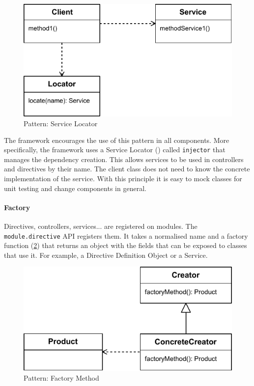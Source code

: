 \begin{figure}[htb]
    \centering
    \includegraphics{figures/design-patterns-servicelocator.pdf}
    \caption{Pattern: Service Locator}
    \label{fig:design-service-locator}
\end{figure}

The framework encourages the use of this pattern in all components. 
More specifically, the framework uses a Service Locator () called \texttt{injector} that manages the dependency creation.
This allows services to be used in controllers and directives by their name.
The client class does not need to know the concrete implementation of the service. 
With this principle it is easy to mock classes for unit testing and change components in general.


\paragraph{Factory} Directives, controllers, services... are registered on modules. 
The \texttt{module.directive} \ac{API} registers them. 
It takes a normalised name and a factory function (\ref{fig:design-patterns-factory}) that returns an object with the fields that can be exposed to classes that use it.
For example, a Directive Definition Object or a Service.

\begin{figure}[htb]
    \centering
    \includegraphics{figures/design-patterns-factory.pdf}
    \caption{Pattern: Factory Method}
    \label{fig:design-patterns-factory}
\end{figure}

